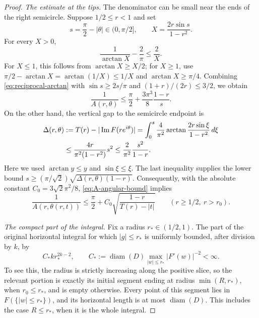 \begin{proof}
\smallskip
\noindent\emph{The estimate at the tips.} The denominator can be small near the ends of the right semicircle. Suppose $1/2\le r<1$ and set
\[
 s=\frac{\pi}{2}-|\theta|\in(0,\pi/2],
 \qquad
 X=\frac{2r\sin s}{1-r^2}.
\]
For every $X>0$,
\begin{equation}\label{eq:reciprocal-arctan}
 \frac{1}{\arctan X}-\frac{2}{\pi}\le\frac{2}{X}.
\end{equation}
For $X\le1$, this follows from $\arctan X\ge X/2$; for $X\ge1$, use $\pi/2-\arctan X=\arctan(1/X)\le1/X$ and $\arctan X\ge\pi/4$.  Combining \eqref{eq:reciprocal-arctan} with $\sin s\ge2s/\pi$ and $(1+r)/(2r)\le3/2$, we obtain
\begin{equation}\label{eq:A-angular-bound}
 \frac1{A(r,\theta)}
    \le\frac{\pi}{2}+\frac{3\pi^3}{8}\frac{1-r}{s}.
\end{equation}
On the other hand, the vertical gap to the semicircle endpoint is
\begin{align}
 \Delta(r,\theta)
   &:=T(r)-|\Im F(re^{i\theta})|
     =\int_0^s\frac{4}{\pi^2}
          \arctan\frac{2r\sin\xi}{1-r^2}\,d\xi \notag\\
   &\le\frac{4r}{\pi^2(1-r^2)}s^2
     \le\frac{2}{\pi^2}\frac{s^2}{1-r}.
 \label{eq:vertical-gap}
\end{align}
Here we used $\arctan y\le y$ and $\sin\xi\le\xi$. The last inequality supplies the lower bound $s\ge(\pi/\sqrt2)\sqrt{\Delta(r,\theta)(1-r)}$. Consequently, with the absolute constant $C_0=3\sqrt2\pi^2/8$, \eqref{eq:A-angular-bound} implies
\begin{equation}\label{eq:A-slice-bound}
 \frac1{A(r,\theta(r,t))}
   \le\frac{\pi}{2}
        +C_0\sqrt{\frac{1-r}{T(r)-|t|}}
 \qquad (r\ge1/2,\ r>r_0).
\end{equation}

\smallskip
\noindent\emph{The compact part of the integral.} Fix a radius $r_*\in(1/2,1)$.  The part of the original horizontal integral for which $|g|\le r_*$ is uniformly bounded, after division by $k$, by
\begin{equation}\label{eq:slice-inner-bound}
 C_*k r_*^{2k-2},
 \qquad
 C_*:=\operatorname{diam}(D)
          \max_{|w|\le r_*}|F'(w)|^{-2}<\infty.
\end{equation}
To see this, the radius is strictly increasing along the positive slice, so the relevant portion is exactly its initial segment ending at radius $\min(R,r_*)$, when $r_0\le r_*$, and is empty otherwise. Every point of this segment lies in $F(\{|w|\le r_*\})$, and its horizontal length is at most $\operatorname{diam}(D)$. This includes the case $R\le r_*$, when it is the whole integral.


\end{proof}
